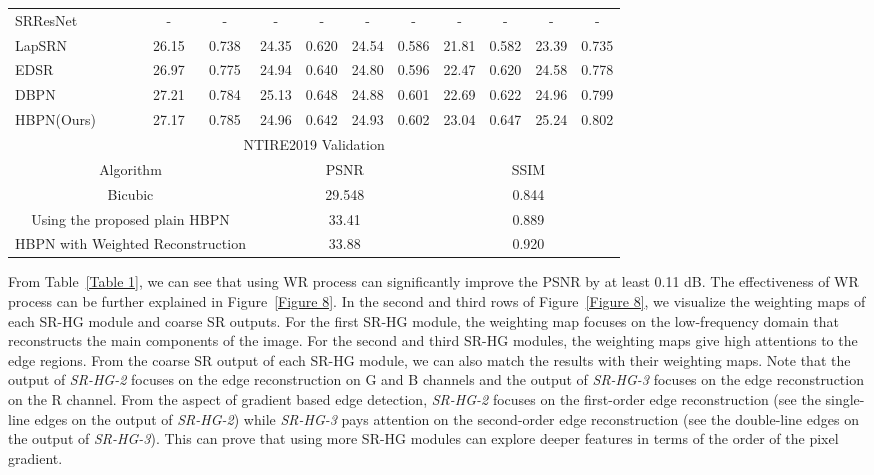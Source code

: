 \documentclass[10pt,twocolumn,letterpaper]{article}
\begin{document}
\begin{table*}[t]
\begin{center}
\begin{small}
{\begin{tabular}{lccccccccccc}
SRResNet~\cite{SRGAN} &  & - & - & - & - & - & - & - & - & - & - \\
LapSRN~\cite{LapSRN} &  & 26.15 & 0.738 & 24.35 & 0.620 & 24.54 & 0.586 & 21.81 & 0.582 & 23.39 & 0.735 \\
EDSR~\cite{EDSR} &  & 26.97 & 0.775 & 24.94 & 0.640 & 24.80 & 0.596 & 22.47 & 0.620 & 24.58 & 0.778 \\
DBPN~\cite{DBPN} &  & {\color{red}27.21} & {\color{blue}0.784} & {\color{red}25.13} & {\color{red}0.648} & {\color{blue}24.88} & {\color{blue}0.601} & {\color{blue}22.69} & {\color{blue}0.622} & {\color{blue}24.96} & {\color{blue}0.799} \\
HBPN(Ours) &  & {\color{blue}27.17} & {\color{red}0.785} & {\color{blue}24.96} & {\color{blue}0.642} & {\color{red}24.93} & {\color{red}0.602} & {\color{red}23.04} & {\color{red}0.647} & {\color{red}25.24} & {\color{red}0.802} \\ \hline
\multicolumn{12}{c}{NTIRE2019 Validation} \\
\hline
\multicolumn{4}{c}{Algorithm} & \multicolumn{4}{c}{PSNR} & \multicolumn{4}{c}{SSIM} \\
\hline
\multicolumn{4}{c}{Bicubic} & \multicolumn{4}{c}{29.548} & \multicolumn{4}{c}{0.844} \\
\multicolumn{4}{c}{Using the proposed plain HBPN} & \multicolumn{4}{c}{{\color{blue}33.41}} & \multicolumn{4}{c}{{\color{blue}0.889}} \\
\multicolumn{4}{c}{HBPN with Weighted Reconstruction} & \multicolumn{4}{c}{{\color{red}33.88}} & \multicolumn{4}{c}{{\color{red}0.920}} \\ \hline
\end{tabular}
}
\end{small}
\end{center}
\vskip -0.3in
\end{table*}

From Table~\ref{Table 1}, we can see that using WR process can significantly improve the PSNR by at least 0.11 dB. The effectiveness of WR process can be further explained in Figure~\ref{Figure 8}. In the second and third rows of Figure~\ref{Figure 8}, we visualize the weighting maps of each SR-HG module and coarse SR outputs. For the first SR-HG module, the weighting map focuses on the low-frequency domain that reconstructs the main components of the image. For the second and third SR-HG modules, the weighting maps give high attentions to the edge regions. From the coarse SR output of each SR-HG module, we can also match the results with their weighting maps. Note that the output of \textit{SR-HG-2} focuses on the edge reconstruction on G and B channels and the output of \textit{SR-HG-3} focuses on the edge reconstruction on the R channel. From the aspect of gradient based edge detection, \textit{SR-HG-2} focuses on the first-order edge reconstruction (see the single-line edges on the output of \textit{SR-HG-2}) while \textit{SR-HG-3} pays attention on the second-order edge reconstruction (see the double-line edges on the output of \textit{SR-HG-3}). This can prove that using more SR-HG modules can explore deeper features in terms of the order of the pixel gradient.  
\end{document}
